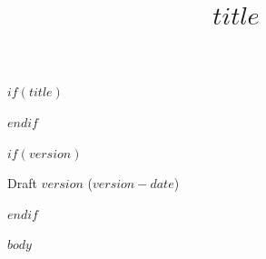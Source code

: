 \documentclass[11pt,a4paper]{article}
\title{\textbf{$title$}}
\date{}
\begin{document}
$if(title)$
\maketitle
$endif$

$if(version)$
{\small Draft $version$ ($version-date$)\par}
$endif$

$body$
\end{document}
